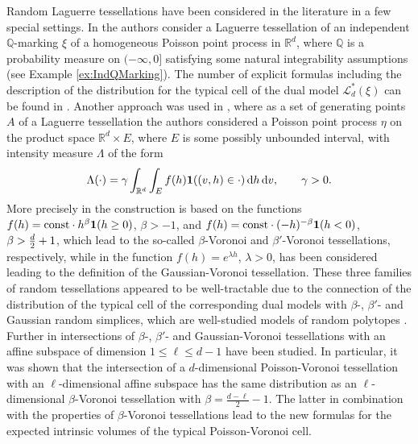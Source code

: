 \documentclass[11pt,a4paper]{article}
\theoremstyle{plain}
\theoremstyle{definition}
\theoremstyle{remark}
\def\QQ{\mathbb{Q}}
\def\RR{\mathbb{R}}
\def\cL{\mathcal{L}}
\newcommand{\dint}{\textup{d}}
\begin{document}
Random Laguerre tessellations have been considered in the literature in a few special settings. In \cite{Ldoc,LZ08} the authors consider a Laguerre tessellation of an independent $\QQ$-marking $\xi$ of a homogeneous Poisson point process in $\RR^d$, where $\QQ$ is a probability measure on $(-\infty,0]$ satisfying some natural integrability assumptions (see Example \ref{ex:IndQMarking}). The number of explicit formulas including the description of the distribution for the typical cell of the dual model $\cL^*_d(\xi)$ can be found in \cite{Ldoc}. Another approach was used in \cite{GKT20, GKT21}, where as a set of generating points $A$ of a Laguerre tessellation the authors considered a Poisson point process $\eta$ on the product space $\RR^d\times E$, where $E$ is some possibly unbounded interval, with intensity measure $\Lambda$ of the form
\begin{equation}\label{eq:IntensityMeasure}
    \Lambda(\cdot)=\gamma\int_{\RR^d}\int_{E}f(h){\bf 1}((v,h)\in\cdot)\,\dint h\,\dint v,\qquad \gamma>0.
\end{equation}
More precisely in \cite{GKT20} the construction is based on the functions $f(h)={\rm const}\cdot h^{\beta}{\bf 1}(h\ge 0)$, $\beta>-1$, and $f(h)={\rm const}\cdot (-h)^{-\beta}{\bf 1}(h<0)$, $\beta>{d\over 2}+1$, which lead to the so-called $\beta$-Voronoi and $\beta'$-Voronoi tessellations, respectively, while in \cite{GKT21} the function $f(h)=e^{\lambda h}$, $\lambda>0$, has been considered leading to the definition of the Gaussian-Voronoi tessellation. These three families of random tessellations appeared to be well-tractable due to the connection of the distribution of the typical cell of the corresponding dual models with $\beta$-, $\beta'$- and Gaussian random simplices, which are well-studied models of random polytopes \cite{Miles_IRS, KZT20}. Further in \cite{sectional} intersections of $\beta$-, $\beta'$- and Gaussian-Voronoi tessellations with an affine subspace of dimension $1\leq \ell\leq d-1$ have been studied. In particular, it was shown that the intersection of a $d$-dimensional Poisson-Voronoi tessellation with an $\ell$-dimensional affine subspace has the same distribution as an $\ell$-dimensional $\beta$-Voronoi tessellation with $\beta=\frac{d-\ell}{2}-1$. The latter in combination with the properties of $\beta$-Voronoi tessellations lead to the new formulas for the expected intrinsic volumes of the typical Poisson-Voronoi cell.
\end{document}
